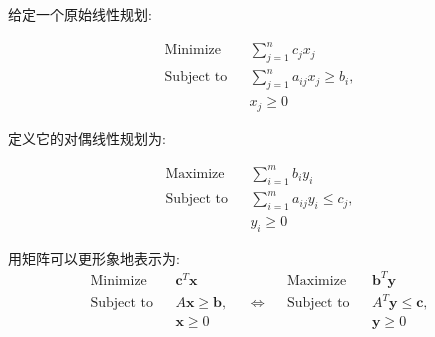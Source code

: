 给定一个原始线性规划:

$$
\begin{aligned}
\text{Minimize}&&\sum_{j=1}^n c_j x_j\\
\text{Subject to}&&\sum_{j=1}^n a_{ij} x_j\ge b_i,\\
&&x_j\ge 0
\end{aligned}
$$

定义它的对偶线性规划为:

$$
\begin{aligned}
\text{Maximize}&&\sum_{i=1}^m b_i y_i\\
\text{Subject to}&&\sum_{i=1}^m a_{ij} y_i\le c_j,\\
&&y_i\ge 0
\end{aligned}
$$

用矩阵可以更形象地表示为:
$$
\begin{aligned}
\text{Minimize}&& \mathbf c^T \mathbf x &&&& \text{Maximize} && \mathbf b^{T}\mathbf y\\
\text{Subject to}&& A\mathbf x \ge \mathbf b, && \Longleftrightarrow && \text{Subject to} && A^T\mathbf y \le \mathbf c,\\
&& \mathbf x\ge 0 &&&&&& \mathbf y\ge 0
\end{aligned}
$$